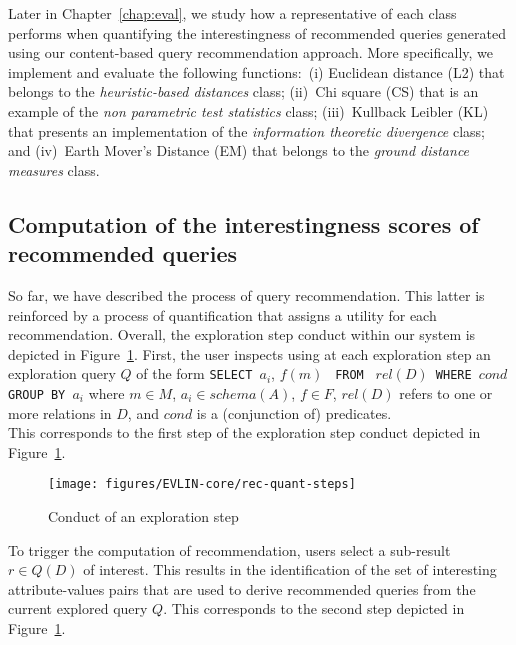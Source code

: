 Later in Chapter~\ref{chap:eval}, we study how a representative of each class performs when quantifying the interestingness of recommended queries generated using our content-based query recommendation approach.
  More specifically, we implement and evaluate the following functions:~(i) Euclidean distance (L2) that belongs to the \emph{heuristic-based distances} class; (ii)~Chi square (CS) that is an example of the \emph{non parametric test statistics} class; (iii)~Kullback Leibler (KL) that presents an implementation of the \emph{information theoretic divergence} class; and (iv)~Earth Mover's Distance (EM) that belongs to the \emph{ground distance measures} class. 
  



 \subsection{Computation of the interestingness scores of recommended queries}
\label{sec:rec-computation}
So far, we have described the process of query recommendation. This latter is reinforced by a process of quantification that assigns a utility for each recommendation.
Overall, the exploration step conduct within our system \prototype{} is depicted in Figure~\ref{fig:exStepConduct}.
First, the user inspects using \prototype{} at each exploration step an exploration query $Q$ of the form
{\obeylines\obeyspaces
\texttt{SELECT }$a_i$, $f(m)$ \texttt{ FROM } $rel(D)$\texttt{ WHERE }$cond$ \texttt{ GROUP BY }$a_i$ 
}
\noindent where $m \in M$, $a_i \in schema(A)$, $f \in F$, $rel(D)$ refers to one or more relations in $D$, and $cond$ is a (conjunction of) predicates.\\
This corresponds to the first step of the exploration step conduct depicted in Figure~\ref{fig:exStepConduct}. 


\begin{figure}[b]
\centering
\texttt{[image: figures/EVLIN-core/rec-quant-steps]}
\caption{Conduct of an exploration step}
\label{fig:exStepConduct}
\end{figure}



To trigger the computation of recommendation, users select a sub-result $r \in Q(D)$ of interest.  This results in the identification of the set of interesting attribute-values pairs that are used to derive recommended queries from the current explored query $Q$. 
This corresponds to the second step depicted in Figure~\ref{fig:exStepConduct}. 

